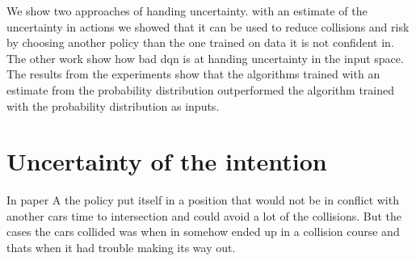 	
	


We show two approaches of handing uncertainty. with an estimate of the uncertainty in actions we showed that it can be used to reduce collisions and risk by choosing another policy than the one trained on data it is not confident in. 
The other work show how bad \gls{dqn} is at handing uncertainty in the input space. The results from the experiments show that the algorithms trained with an estimate from the probability distribution outperformed the algorithm trained with the probability distribution as inputs. 

\section{Uncertainty of the intention}
In paper A the policy put itself in a position that would not be in conflict with another cars time to intersection and could avoid a lot of the collisions. But the cases the cars collided was when in somehow ended up in a collision course and thats when it had trouble making its way out. 

